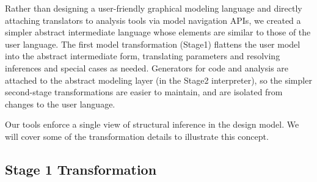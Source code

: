   Rather than designing
a user-friendly graphical modeling language and directly attaching translators
to analysis tools via model navigation APIs\cite{mic:udm}, we created a 
simpler abstract intermediate language whose
elements are similar to those of the user language. The first model
transformation (Stage1) flattens the user model into the abstract intermediate 
form, translating parameters and resolving inferences and special cases as 
needed. Generators 
for code and analysis are attached to the abstract modeling layer (in the 
Stage2 interpreter), so the 
simpler second-stage transformations are easier to maintain, and are isolated 
from changes to the user language.

Our tools enforce a single view of structural inference in the design model. We
will cover some of the transformation details to illustrate this concept.

\subsection{Stage 1 Transformation}
\label{sect:stage1}


